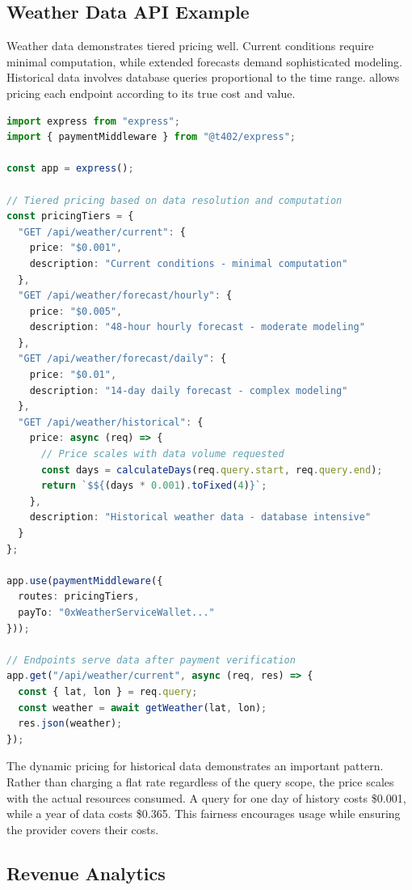 \subsection{Weather Data API Example}

Weather data demonstrates tiered pricing well. Current conditions require minimal computation, while extended forecasts demand sophisticated modeling. Historical data involves database queries proportional to the time range. \tprotocol{} allows pricing each endpoint according to its true cost and value.

\begin{lstlisting}[language=typescript,caption={Weather API with tiered pricing reflecting computational cost}]
import express from "express";
import { paymentMiddleware } from "@t402/express";

const app = express();

// Tiered pricing based on data resolution and computation
const pricingTiers = {
  "GET /api/weather/current": {
    price: "$0.001",
    description: "Current conditions - minimal computation"
  },
  "GET /api/weather/forecast/hourly": {
    price: "$0.005",
    description: "48-hour hourly forecast - moderate modeling"
  },
  "GET /api/weather/forecast/daily": {
    price: "$0.01",
    description: "14-day daily forecast - complex modeling"
  },
  "GET /api/weather/historical": {
    price: async (req) => {
      // Price scales with data volume requested
      const days = calculateDays(req.query.start, req.query.end);
      return `$${(days * 0.001).toFixed(4)}`;
    },
    description: "Historical weather data - database intensive"
  }
};

app.use(paymentMiddleware({
  routes: pricingTiers,
  payTo: "0xWeatherServiceWallet..."
}));

// Endpoints serve data after payment verification
app.get("/api/weather/current", async (req, res) => {
  const { lat, lon } = req.query;
  const weather = await getWeather(lat, lon);
  res.json(weather);
});
\end{lstlisting}

The dynamic pricing for historical data demonstrates an important pattern. Rather than charging a flat rate regardless of the query scope, the price scales with the actual resources consumed. A query for one day of history costs \$0.001, while a year of data costs \$0.365. This fairness encourages usage while ensuring the provider covers their costs.

\subsection{Revenue Analytics}

